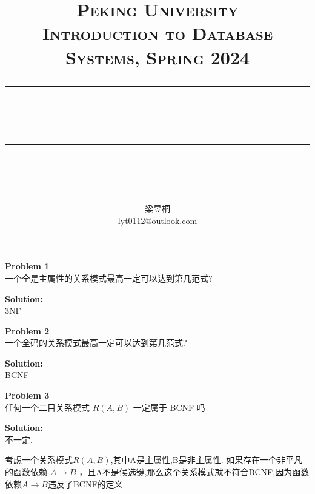 \documentclass[12pt]{article} %
\newenvironment{problem}[2][Problem]
    { \begin{mdframed}[backgroundcolor=gray!20] \textbf{#1 #2} \\}
    {  \end{mdframed}}
\newenvironment{solution}
    { \begin{mdframed} \textbf{Solution:} \\}
    {  \end{mdframed}}
\newcommand{\horrule}[1]{\rule[0.5ex]{\linewidth}{#1}} 	%
\begin{document}
\title{
{\normalfont\normalsize\textsc{
Peking University\\
Introduction to Database Systems, Spring 2024 \\[25pt]}}
\horrule{0.5pt}\\
\horrule{1.8pt}\\[20pt]
}
\author{梁昱桐\\lyt0112@outlook.com}

\begin{titlepage}
\maketitle
\vspace{30pt}


\thispagestyle{empty}
\end{titlepage}


\newpage
\setcounter{page}{1}

\begin{problem}{1}
一个全是主属性的关系模式最高一定可以达到第几范式?
\end{problem}

\begin{solution}
3NF
\end{solution}

\begin{problem}{2}
一个全码的关系模式最高一定可以达到第几范式?
\end{problem}

\begin{solution}
BCNF
\end{solution}

\begin{problem}{3}
任何一个二目关系模式 $R(A,B)$ 一定属于 BCNF 吗
\end{problem}
\begin{solution}
不一定.

考虑一个关系模式$R(A,B)$,其中A是主属性,B是非主属性.
如果存在一个非平凡的函数依赖 $A\rightarrow B$ ，且A不是候选键,那么这个关系模式就不符合BCNF,因为函数依赖$A\rightarrow B$违反了BCNF的定义.
\end{solution}
\end{document}
